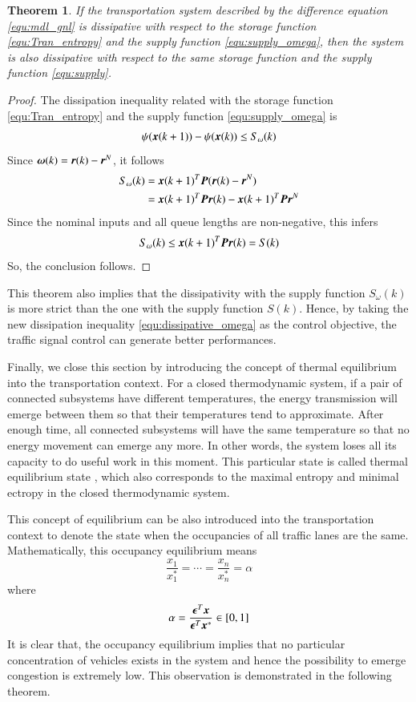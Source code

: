 \documentclass[preprint,authoryear,12pt]{elsarticle}
\renewcommand{\vec}[1]{\mbox{\boldmath$#1$}}
\newcommand{\mat}[1]{\mbox{\boldmath$#1$}}
\newtheorem{thm}{Theorem}
\begin{document}
\begin{thm}
If the transportation system described by the difference equation \eqref{equ:mdl_gnl} is dissipative with respect to the storage function \eqref{equ:Tran_entropy} and the supply function \eqref{equ:supply_omega}, then the system is also dissipative with respect to the same storage function and the supply function \eqref{equ:supply}.
\end{thm}
\begin{proof}
The dissipation inequality related with the storage function \eqref{equ:Tran_entropy} and the supply function \eqref{equ:supply_omega} is
\begin{equation}\label{equ:dissipative_omega}
  \psi(\vec{x}(k+1))-\psi(\vec{x}(k)) \leq S_\omega(k)
\end{equation}
Since $\vec{\omega}(k)=\vec{r}(k)-\vec{r}^N$, it follows
\begin{align*}
S_\omega(k) &= \vec{x}(k+1)^T \mat{P} (\vec{r}(k)-\vec{r}^N)\\
    &= \vec{x}(k+1)^T \mat{P} \vec{r}(k)-\vec{x}(k+1)^T\mat{P}\vec{r}^N
\end{align*}
Since the nominal inputs and all queue lengths are non-negative, this infers
$$S_\omega(k)\leq \vec{x}(k+1)^T \mat{P} \vec{r}(k) = S(k)$$
So, the conclusion follows.
\end{proof}
This theorem also implies that the dissipativity with the supply function $S_\omega(k)$ is more strict than the one with the supply function $S(k)$. Hence, by taking the new dissipation inequality \eqref{equ:dissipative_omega} as the control objective, the traffic signal control can generate better performances.

Finally, we close this section by introducing the concept of thermal equilibrium into the transportation context. For a closed thermodynamic system, if a pair of connected subsystems have different temperatures, the energy transmission will emerge between them so that their temperatures tend to approximate. After enough time, all connected subsystems will have the same temperature so that no energy movement can emerge any more. In other words, the system loses all its capacity to do useful work in this moment. This particular state is called thermal equilibrium state \citep{cengel_thermodynamics:_2001}, which also corresponds to the maximal entropy and minimal ectropy in the closed thermodynamic system.

This concept of equilibrium can be also introduced into the transportation context to denote the state when the occupancies of all traffic lanes are the same. Mathematically, this occupancy equilibrium means
\begin{equation}\label{equ:equilibrium}
\frac{x_1}{x_1^*}=\cdots=\frac{x_n}{x_n^*}=\alpha
\end{equation}
where
$$\alpha = \frac{\vec{\epsilon}^T\vec{x}}{\vec{\epsilon}^T\vec{x}^*}
\in[0,1]$$
It is clear that, the occupancy equilibrium implies that no particular concentration of vehicles exists in the system and hence the possibility to emerge congestion is extremely low. This observation is demonstrated in the following theorem.
\end{document}
